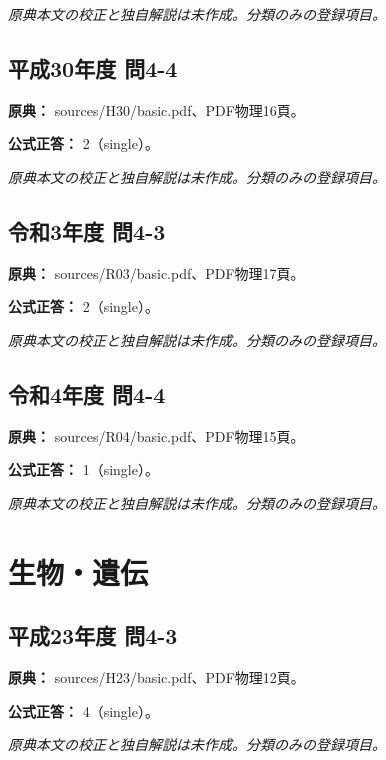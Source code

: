 \par\textit{原典本文の校正と独自解説は未作成。分類のみの登録項目。}

\subsection{平成30年度 問4-4}
\label{q:h30-reg-basic-4-4}

\noindent\textbf{原典：} sources/H30/basic.pdf、PDF物理16頁。

\textbf{公式正答：} 2（single）。

\par\textit{原典本文の校正と独自解説は未作成。分類のみの登録項目。}

\subsection{令和3年度 問4-3}
\label{q:r03-reg-basic-4-3}

\noindent\textbf{原典：} sources/R03/basic.pdf、PDF物理17頁。

\textbf{公式正答：} 2（single）。

\par\textit{原典本文の校正と独自解説は未作成。分類のみの登録項目。}

\subsection{令和4年度 問4-4}
\label{q:r04-reg-basic-4-4}

\noindent\textbf{原典：} sources/R04/basic.pdf、PDF物理15頁。

\textbf{公式正答：} 1（single）。

\par\textit{原典本文の校正と独自解説は未作成。分類のみの登録項目。}

\section{生物・遺伝}

\subsection{平成23年度 問4-3}
\label{q:h23-reg-basic-4-3}

\noindent\textbf{原典：} sources/H23/basic.pdf、PDF物理12頁。

\textbf{公式正答：} 4（single）。

\par\textit{原典本文の校正と独自解説は未作成。分類のみの登録項目。}

